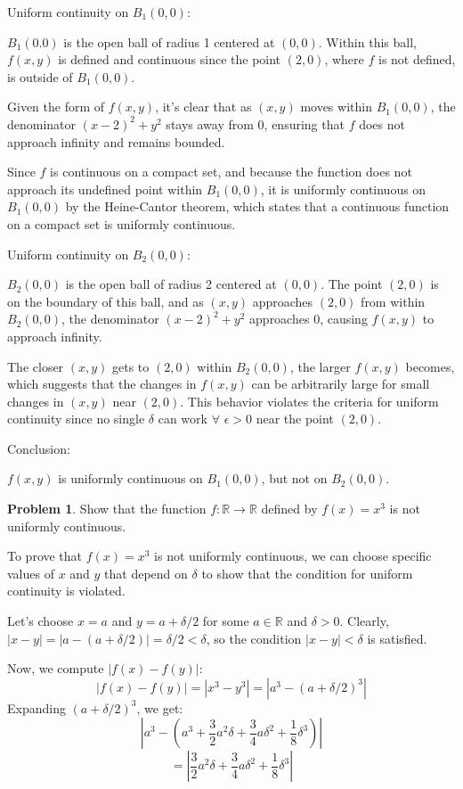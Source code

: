 \documentclass[12]{amsart}
\theoremstyle{definition}
\newtheorem{xca}{Problem}
\newcommand{\R}{\mathbb{R}}
\newcommand{\sskip}{\newpage}
\begin{document}
Uniform continuity on $B_1(0, 0)$:

$B_1(0. 0)$ is the open ball of radius 1 centered at $(0, 0)$.
Within this ball, $f(x, y)$ is defined and continuous since the point
$(2, 0)$, where $f$ is not defined, is outside of $B_1(0, 0)$.

Given the form of $f(x, y)$, it's clear that as $(x, y)$ moves within $B_1(0, 0)$,
the denominator $(x-2)^2 + y^2$ stays away from $0$, ensuring that $f$
does not approach infinity and remains bounded.

Since $f$ is continuous on a compact set, and because the function does not approach
its undefined point within $B_1(0, 0)$, it is uniformly continuous
on $B_1(0, 0)$ by the Heine-Cantor theorem, which states that a continuous
function on a compact set is uniformly continuous.

Uniform continuity on $B_2(0, 0)$:

$B_2(0, 0)$ is the open ball of radius 2 centered at $(0, 0)$. The point $(2, 0)$
is on the boundary of this ball, and as $(x, y)$ approaches $(2, 0)$
from within $B_2(0, 0)$, the denominator $(x-2)^2 + y^2$ approaches $0$,
causing $f(x, y)$ to approach infinity.

The closer $(x, y)$ gets to $(2, 0)$ within $B_2(0, 0)$,
the larger $f(x, y)$ becomes, which suggests that the changes in $f(x, y)$
can be arbitrarily large for small changes in $(x, y)$ near $(2, 0)$.
This behavior violates the criteria for uniform continuity since no single
$\delta$ can work $\forall$ $\epsilon > 0$ near the point $(2, 0)$.

Conclusion:

$f(x, y)$ is uniformly continuous on $B_1(0, 0)$, but not on $B_2(0, 0)$.

\sskip


\begin{xca}
Show that the function $f:\R\to\R$ defined by $f(x)=x^3$ is not uniformly continuous.
\end{xca}

To prove that $f(x) = x^3$ is not uniformly continuous, we can choose
specific values of $x$ and $y$ that depend on $\delta$ to show that the condition for
uniform continuity is violated.

Let's choose $x = a$ and $y = a + \delta/2$ for some $a \in \R$ and $\delta > 0$.
Clearly, $|x - y| = |a - (a + \delta/2)| = \delta/2 < \delta$, so the condition
$|x - y| < \delta$ is satisfied.

Now, we compute $|f(x) - f(y)|$:
\[|f(x) - f(y)| = |x^3 - y^3| = |a^3 - (a + \delta/2)^3|\]
Expanding $(a + \delta/2)^3$, we get:
\[\left|a^3 - \left(a^3 + \frac{3}{2} a^2 \delta + \frac{3}{4} a \delta^2 + \frac{1}{8} \delta^3\right)\right|\]
\[= \left|\frac{3}{2} a^2 \delta + \frac{3}{4} a \delta^2 + \frac{1}{8} \delta^3\right|\]
\end{document}
